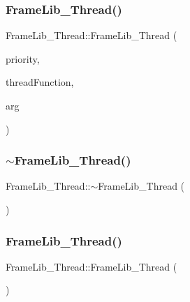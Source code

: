 \subsubsection{\texorpdfstring{Frame\+Lib\+\_\+\+Thread()}{FrameLib\_Thread()}\hspace{0.1cm}{\footnotesize\ttfamily [1/2]}}
{\footnotesize\ttfamily Frame\+Lib\+\_\+\+Thread\+::\+Frame\+Lib\+\_\+\+Thread (\begin{DoxyParamCaption}\item[{\hyperlink{class_frame_lib___thread_a99a5e56edcadf37e3388f5557e8ec7ed}{Priority\+Level}}]{priority,  }\item[{Thread\+Function\+Type $\ast$}]{thread\+Function,  }\item[{void $\ast$}]{arg }\end{DoxyParamCaption})\hspace{0.3cm}{\ttfamily [inline]}}

\mbox{\label{class_frame_lib___thread_a3131c05e77de52925145496a8a7d0bb1}} 
\subsubsection{\texorpdfstring{$\sim$\+Frame\+Lib\+\_\+\+Thread()}{~FrameLib\_Thread()}}
{\footnotesize\ttfamily Frame\+Lib\+\_\+\+Thread\+::$\sim$\+Frame\+Lib\+\_\+\+Thread (\begin{DoxyParamCaption}{ }\end{DoxyParamCaption})}

\mbox{\label{class_frame_lib___thread_a0c371ea3c0cf803ffc568fcb28d0a41a}} 
\subsubsection{\texorpdfstring{Frame\+Lib\+\_\+\+Thread()}{FrameLib\_Thread()}\hspace{0.1cm}{\footnotesize\ttfamily [2/2]}}
{\footnotesize\ttfamily Frame\+Lib\+\_\+\+Thread\+::\+Frame\+Lib\+\_\+\+Thread (\begin{DoxyParamCaption}\item[{const \hyperlink{class_frame_lib___thread}{Frame\+Lib\+\_\+\+Thread} \&}]{ }\end{DoxyParamCaption})\hspace{0.3cm}{\ttfamily [delete]}}



